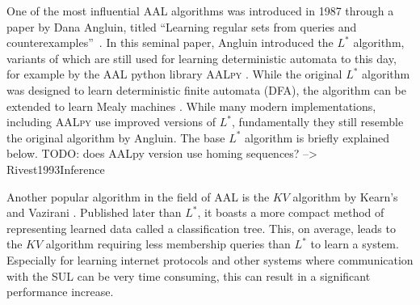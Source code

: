 One of the most influential AAL algorithms was introduced in 1987 through a paper by Dana Angluin, titled ``Learning regular sets from queries and counterexamples''~\parencite{ANGLUIN198787}. In this seminal paper, Angluin introduced the $L^*$ algorithm, variants of which are still used for learning deterministic automata to this day, for example by the AAL python library \textsc{AALpy} \parencite{muvskardin2022aalpy}. While the original $L^*$ algorithm was designed to learn deterministic finite automata (DFA), the algorithm can be extended to learn Mealy machines \parencite{Niese2003AnIA}. While many modern implementations, including \textsc{AALpy} use improved versions of $L^*$, fundamentally they still resemble the original algorithm by Angluin. The base $L^*$ algorithm is briefly explained below. TODO: does AALpy version use homing sequences? --> Rivest1993Inference

Another popular algorithm in the field of AAL is the $KV$ algorithm by Kearn's and Vazirani \parencite{KV1994}. Published later than $L^*$, it boasts a more compact method of representing learned data called a classification tree. This, on average, leads to the $KV$ algorithm requiring less membership queries than $L^*$ to learn a system. Especially for learning internet protocols and other systems where communication with the SUL can be very time consuming, this can result in a significant performance increase.

